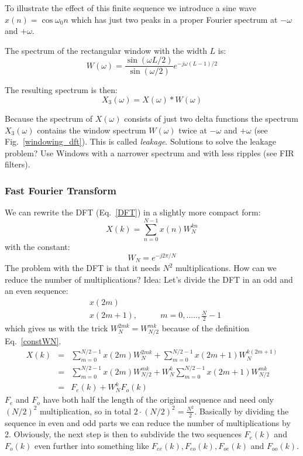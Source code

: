 \documentclass[12pt,a4paper]{article}
\begin{document}
To illustrate the effect of this finite sequence we introduce a sine
wave $x(n) = \cos \omega_0 n$ which has just two peaks in a proper
Fourier spectrum at $-\omega$ and $+\omega$.

The spectrum of the rectangular window with the width $L$ is:
\begin{equation} 
W(\omega) = \frac{\sin(\omega L /2)}{\sin (\omega / 2)} e^{-j\omega (L -1)/2}
\end{equation}

The resulting spectrum is then:
\begin{equation} 
X_{3}(\omega) = X(\omega) * W(\omega)
\end{equation}

Because the spectrum of $X(\omega)$ consists of just two delta functions
the spectrum $X_{3}(\omega)$ contains the window spectrum $W(\omega)$ twice at
$-\omega$ and $+\omega$ (see Fig.~\ref{windowing_dft}). This
is called \textsl{leakage}. Solutions to solve the leakage problem?
Use Windows with a narrower spectrum and with less ripples
(see FIR filters).








\subsubsection{Fast Fourier Transform}

We can rewrite the DFT (Eq.~\ref{DFT}) in a slightly more compact form:
\begin{equation} 
X(k) = \sum_{n = 0}^{N-1}  x(n) W_{N}^{kn}
\label{compactDFT}
\end{equation}
with the constant:
\begin{equation} 
W_{N} = e^{-j 2\pi/N}
\label{constWN}
\end{equation}
The problem with the DFT is that it needs $N^2$ multiplications.
How can we reduce the number of multiplications?
Idea: Let's divide the DFT in an odd and an even sequence:
\begin{eqnarray}
& x(2m) & \\
& x(2m + 1), & \qquad m = 0, ..... , \frac{N}{2} - 1
\end{eqnarray}
which gives us with the trick $W_N^{2mk} = W_{N/2}^{mk}$ because of the
definition Eq.~\ref{constWN}.
\begin{eqnarray} 
X(k) & = & \sum_{m=0}^{N/2-1} x(2m) W_{N}^{2mk} + \sum_{m=0}^{N/2 - 1}  x(2m + 1) W_{N}^{k (2m + 1)} \\
& = & \sum_{m=0}^{N/2-1} x(2m) W_{N/2}^{mk} + W_{N}^{k} \sum_{m = 0}^{N/2 - 1} x(2m + 1) W_{N/2}^{mk} \\
& = & F_{e}(k) + W_{N}^{k} F_{o}(k)
\end{eqnarray}
$F_e$ and $F_o$ have both half the length of the original sequence and
need only $(N/2)^2$ multiplication, so in total $2 \cdot (N/2)^2 = \frac{N^2}{2}$.
Basically by dividing the sequence in even and odd parts we can reduce
the number of multiplications by 2. Obviously, the next step is then
to subdivide the two sequences $F_{e}(k)$ and $F_{o}(k)$ even further
into something like $F_{ee}(k), F_{eo}(k), F_{oe}(k)$ and $F_{oo}(k)$.
\end{document}
